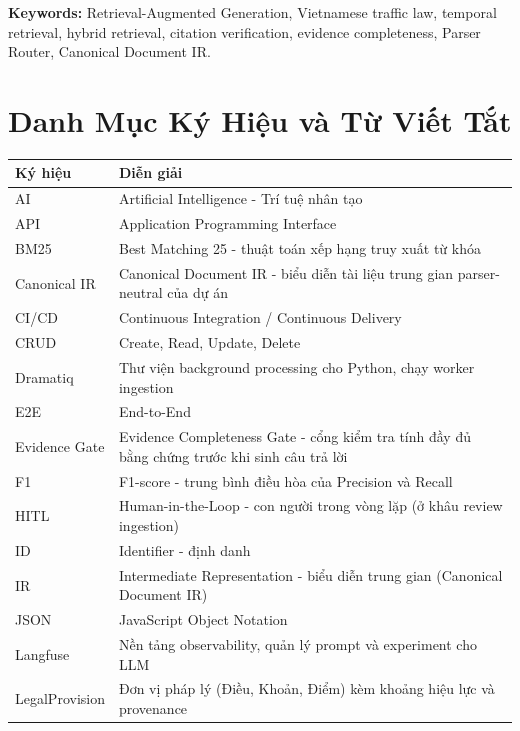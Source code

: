 \documentclass[a4paper,12pt]{extreport}
\newif\ifdraftmode
\newcommand{\draftnotice}{%
  \ifdraftmode
  \begin{center}
  \fcolorbox{DraftBorder}{DraftYellow}{%
    \parbox{0.90\textwidth}{%
      \centering\bfseries
      BẢN THẢO KỸ THUẬT - CHƯA CÓ KẾT QUẢ THỰC NGHIỆM CUỐI.\\
      Các bảng kết quả trong Chương 6 phải được thay bằng số liệu từ evaluation run đã đóng băng trước khi nộp.
    }
  }
  \end{center}
  \fi
}
\begin{document}
\draftnotice

\noindent\textbf{Keywords:} Retrieval-Augmented Generation, Vietnamese traffic law, temporal retrieval, hybrid retrieval, citation verification, evidence completeness, Parser Router, Canonical Document IR.
\clearpage

\tableofcontents
\clearpage
\listoftables
{}
\clearpage
\listoffigures
{}
\clearpage

\chapter*{Danh Mục Ký Hiệu và Từ Viết Tắt}

\begin{longtable}{p{3.2cm}p{10.2cm}}
\textbf{Ký hiệu} & \textbf{Diễn giải}\\
\toprule
AI & Artificial Intelligence - Trí tuệ nhân tạo\\
API & Application Programming Interface\\
BM25 & Best Matching 25 - thuật toán xếp hạng truy xuất từ khóa\\
Canonical IR & Canonical Document IR - biểu diễn tài liệu trung gian parser-neutral của dự án\\
CI/CD & Continuous Integration / Continuous Delivery\\
CRUD & Create, Read, Update, Delete\\
Dramatiq & Thư viện background processing cho Python, chạy worker ingestion\\
E2E & End-to-End\\
Evidence Gate & Evidence Completeness Gate - cổng kiểm tra tính đầy đủ bằng chứng trước khi sinh câu trả lời\\
F1 & F1-score - trung bình điều hòa của Precision và Recall\\
HITL & Human-in-the-Loop - con người trong vòng lặp (ở khâu review ingestion)\\
ID & Identifier - định danh\\
IR & Intermediate Representation - biểu diễn trung gian (Canonical Document IR)\\
JSON & JavaScript Object Notation\\
Langfuse & Nền tảng observability, quản lý prompt và experiment cho LLM\\
LegalProvision & Đơn vị pháp lý (Điều, Khoản, Điểm) kèm khoảng hiệu lực và provenance\\

\end{longtable}
\end{document}
